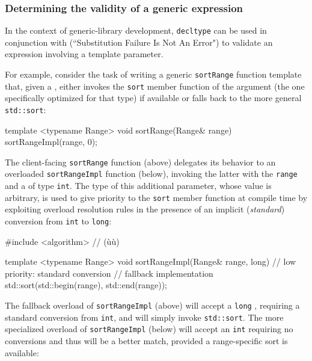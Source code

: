 \subsubsection[Determining the validity of a generic expression]{Determining the validity of a generic expression}\label{determining-the-validity-of-a-generic-expression}

In the context of generic-library development, \lstinline!decltype! can be
used in conjunction with  (``Substitution Failure Is Not An Error") to validate an expression involving a
template parameter.

For example, consider the task of writing a generic \lstinline!sortRange!
function template that, given a , either invokes the
\lstinline!sort! member function of the argument (the one specifically
optimized for that type) if available or falls back to the more
general \lstinline!std::sort!:

\begin{emcppslisting}
template <typename Range>
void sortRange(Range& range)
{
    sortRangeImpl(range, 0);
}
\end{emcppslisting}

\noindent The client-facing \lstinline!sortRange! function (above) delegates its
behavior to an overloaded \lstinline!sortRangeImpl! function (below),
invoking the latter with the \lstinline!range! and a 
of type \lstinline!int!. The type of this additional parameter, whose value
is arbitrary, is used to give priority to the \lstinline!sort! member
function at compile time by exploiting overload resolution rules in
the presence of an implicit (\emph{standard}) conversion from
\lstinline!int! to \lstinline!long!:

\begin{emcppshiddenlisting}[emcppsbatch=e9]
#include <algorithm>  // (ù{}ù)
\end{emcppshiddenlisting}
\begin{emcppslisting}[emcppsbatch=e9]
template <typename Range>
void sortRangeImpl(Range& range,
                   long)                  // low priority: standard conversion
{
    // fallback implementation
    std::sort(std::begin(range), std::end(range));
}
\end{emcppslisting}

\noindent The fallback overload of \lstinline!sortRangeImpl! (above) will accept a
\lstinline!long! , requiring a standard conversion from
\lstinline!int!, and will simply invoke \lstinline!std::sort!. The more
specialized overload of \lstinline!sortRangeImpl! (below) will accept an
\lstinline!int!  requiring no conversions and thus
will be a better match, provided a range-specific sort is available:

